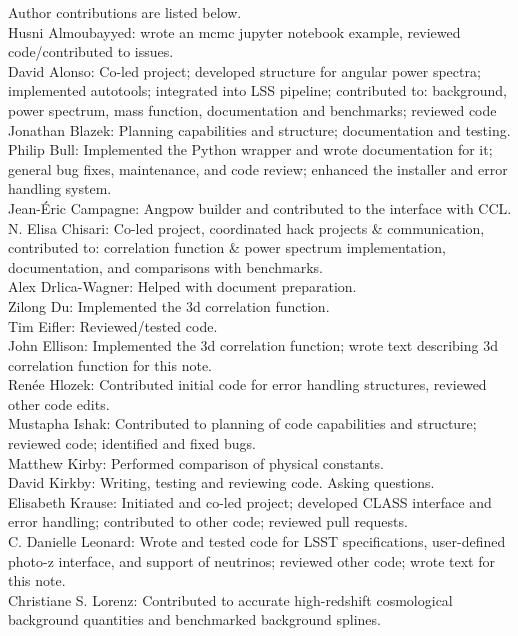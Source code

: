 Author contributions are listed below. \\
Husni Almoubayyed: wrote an mcmc jupyter notebook example, reviewed code/contributed to issues. \\
David Alonso: Co-led project; developed structure for angular power spectra; implemented autotools; integrated into LSS pipeline; contributed to: background, power spectrum, mass function, documentation and benchmarks; reviewed code \\
Jonathan Blazek: Planning capabilities and structure; documentation and testing. \\
Philip Bull: Implemented the Python wrapper and wrote documentation for it; general bug fixes, maintenance, and code review; enhanced the installer and error handling system. \\
Jean-\'Eric Campagne: Angpow builder and contributed to the interface with CCL. \\
N. Elisa Chisari: Co-led project, coordinated hack projects \& communication, contributed to: correlation function \& power spectrum implementation, documentation, and comparisons with benchmarks. \\
Alex Drlica-Wagner: Helped with document preparation. \\
Zilong Du: Implemented the 3d correlation function. \\
Tim Eifler: Reviewed/tested code. \\
John Ellison: Implemented the 3d correlation function; wrote text describing 3d correlation function for this note. \\
Ren\'ee Hlozek: Contributed initial code for error handling structures, reviewed other code edits. \\
Mustapha Ishak: Contributed to planning of code capabilities and structure; reviewed code; identified and fixed bugs. \\
Matthew Kirby: Performed comparison of physical constants. \\
David Kirkby: Writing, testing and reviewing code. Asking questions. \\
Elisabeth Krause: Initiated and co-led project; developed CLASS interface and error handling; contributed to other code; reviewed pull requests. \\
C. Danielle Leonard: Wrote and tested code for LSST specifications, user-defined photo-z interface, and support of neutrinos; reviewed other code; wrote text for this note. \\
Christiane S. Lorenz: Contributed to accurate high-redshift cosmological background quantities and benchmarked background splines. \\

